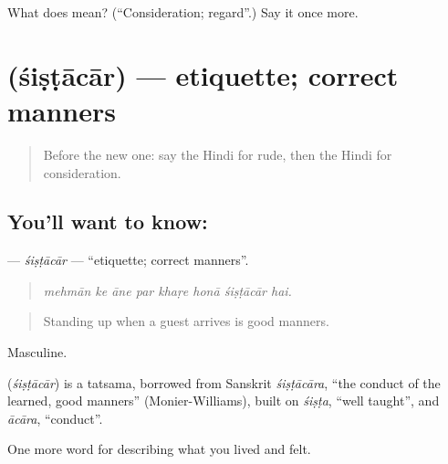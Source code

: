 \begin{tcolorbox}[breakable,colback=teal!4,colframe=teal!35!black,title={Before you move on}]
What does  mean? (\textquotedblleft{}Consideration; regard\textquotedblright{}.) Say it once more.
\end{tcolorbox}
\section[\texorpdfstring{\hi{शिष्टाचार} (śiṣṭācār)}{शिष्टाचार (śiṣṭācār)}]{ (śiṣṭācār) — etiquette; correct manners}

\label{lesson:HI-C471-sistacar}



\begin{quote}
Before the new one: say the Hindi for rude, then the Hindi for consideration.
\end{quote}

\subsection*{You'll want to know: }
\textbf{} — \emph{śiṣṭācār} — \textquotedblleft{}etiquette; correct manners\textquotedblright{}.

\begin{quote}
       
\end{quote}

\begin{quote}
\emph{mehmān ke āne par khaṛe honā śiṣṭācār hai.}
\end{quote}

\begin{quote}
Standing up when a guest arrives is good manners.
\end{quote}

Masculine.

\begin{cousinweb}
\textbf{} (\emph{śiṣṭācār}) is a tatsama, borrowed from Sanskrit \emph{śiṣṭācāra}, \textquotedblleft{}the conduct of the learned, good manners\textquotedblright{} (Monier-Williams), built on \emph{śiṣṭa}, \textquotedblleft{}well taught\textquotedblright{}, and \emph{ācāra}, \textquotedblleft{}conduct\textquotedblright{}.
\end{cousinweb}

\begin{grammarlens}[title={What you've built}]
One more word for describing what you lived and felt.
\end{grammarlens}

